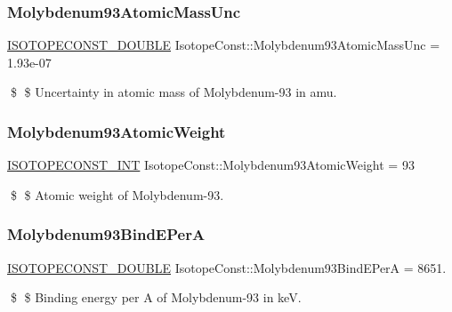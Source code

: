 \subsubsection{\texorpdfstring{Molybdenum93\+Atomic\+Mass\+Unc}{Molybdenum93AtomicMassUnc}}
{\footnotesize\ttfamily \mbox{\hyperlink{group___isotope_const-_macros_ga8f45a7272ce02c0b4c65c44636ed719a}{I\+S\+O\+T\+O\+P\+E\+C\+O\+N\+S\+T\+\_\+\+D\+O\+U\+B\+LE}} Isotope\+Const\+::\+Molybdenum93\+Atomic\+Mass\+Unc = 1.\+93e-\/07}

\$ \$ Uncertainty in atomic mass of Molybdenum-\/93 in amu. \mbox{\label{group___isotope_const-_molybdenum-_mo93_ga5995f206fdd15054687f065dc3fdd6ea}} 
\subsubsection{\texorpdfstring{Molybdenum93\+Atomic\+Weight}{Molybdenum93AtomicWeight}}
{\footnotesize\ttfamily \mbox{\hyperlink{group___isotope_const-_macros_ga5f18360b3e99483a35c32d789e62621c}{I\+S\+O\+T\+O\+P\+E\+C\+O\+N\+S\+T\+\_\+\+I\+NT}} Isotope\+Const\+::\+Molybdenum93\+Atomic\+Weight = 93}

\$ \$ Atomic weight of Molybdenum-\/93. \mbox{\label{group___isotope_const-_molybdenum-_mo93_ga10e74427d2bddb045cbc1b362f186c36}} 
\subsubsection{\texorpdfstring{Molybdenum93\+Bind\+E\+PerA}{Molybdenum93BindEPerA}}
{\footnotesize\ttfamily \mbox{\hyperlink{group___isotope_const-_macros_ga8f45a7272ce02c0b4c65c44636ed719a}{I\+S\+O\+T\+O\+P\+E\+C\+O\+N\+S\+T\+\_\+\+D\+O\+U\+B\+LE}} Isotope\+Const\+::\+Molybdenum93\+Bind\+E\+PerA = 8651.}

\$ \$ Binding energy per A of Molybdenum-\/93 in keV. \mbox{\label{group___isotope_const-_molybdenum-_mo93_gab9d381fa342064afd0888bb6e24da509}} 
